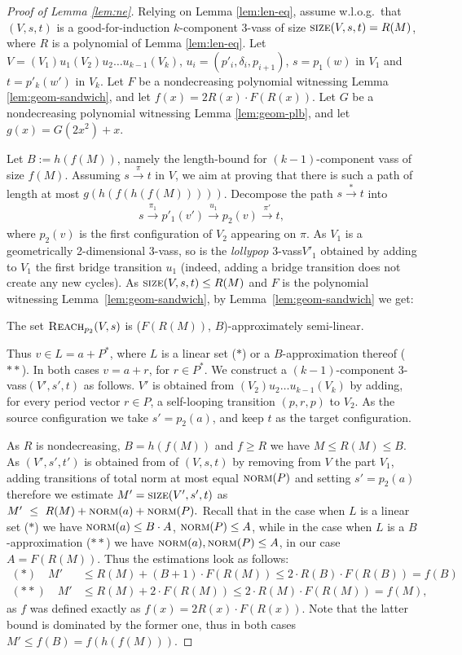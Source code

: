 \documentclass[a4paper, UKenglish, cleveref, autoref, thm-restate]{lipics-v2021}
\newcommand{\reach}{\textsc{Reach}}
\newcommand{\trans}[1]{\stackrel{#1}{\longrightarrow}}
\newcommand{\tran}{\trans{*}}
\newcommand{\norm}{\textsc{norm}}
\newcommand{\size}{\textsc{size}}
\newcommand{\kanapka}[2]{(#1, #2)-approximately semi-linear}
\newcommand{\vass}{{\sc vass}\xspace}
\newcommand{\tvass}{\parvass 3}
\newcommand{\geomvass}{geometrically 2-dimensional \tvass}
\newcommand{\parvass}[1]{{$#1$-\vass}\xspace}
\newcommand{\ktvass}{(V_1) u_1 (V_2) u_2 \ldots u_{k-1} (V_k)}
\newcommand{\ktvasstwo}{(V_2) u_2 \ldots u_{k-1} (V_k)}
\newcommand{\mywlog}{w.l.o.g.~}
\begin{document}
\begin{proof}[Proof of Lemma \ref{lem:ne}]
Relying on Lemma \ref{lem:len-eq}, assume \mywlog that
$(V, s, t)$ is a 
good-for-induction $k$-component \tvass of size
$\size(V, s, t) = R(M)$, where $R$ is a polynomial of Lemma \ref{lem:len-eq}.
Let $V = \ktvass$, $u_i = (p'_i, \delta_i, p_{i+1})$,
$s=p_1(w)$ in $V_1$ and $t=p'_k(w')$ in $V_k$.
Let $F$ be a nondecreasing polynomial witnessing 
Lemma \ref{lem:geom-sandwich}, and
let $f(x) = 2R(x) \cdot F(R(x))$. 
Let $G$ be a nondecreasing polynomial witnessing Lemma  \ref{lem:geom-plb}, and
let $g(x) = G(2x^2) + x$.


Let $B := h(f(M))$, namely the length-bound for $(k-1)$-component \vass of size $f(M)$.
Assuming $s\trans{\pi} t$ in $ V$, we aim at proving that there is such a path of length at most
$g(h(f(h(f(M)))))$.
Decompose the path $s\tran t$ into
\begin{align} \label{eq:pathV}
s \trans{\pi_1} p'_1(v') \trans{u_1} p_2(v) \trans{\pi'} t,
\end{align}
where $p_2(v)$ is the first configuration of $V_2$ appearing on $\pi$.
As $V_1$ is a \geomvass, so is the \emph{lollypop} \tvass $V'_1$ 
obtained by adding to $V_1$ the first bridge transition $u_1$
(indeed, adding a bridge transition does not create any new cycles).
As $\size(V,s,t) \leq R(M)$ and $F$ is the polynomial witnessing Lemma~\ref{lem:geom-sandwich},
by Lemma~\ref{lem:geom-sandwich} we get:
\begin{claim}
The set $\reach_{p_2}(V,s)$ is  \kanapka {$F(R(M))$} {$B$}.
\end{claim}

Thus $v \in L = a + P^*$, where $L$ is a linear set ($*$) or a $B$-approximation thereof ($**$).
In both cases  $v = a + r$, for $r\in P^*$.
We construct a $(k-1)$-component \tvass $(V', s', t)$ as follows.
$V'$ is obtained from $\ktvasstwo$ by adding,
for every period vector $r\in P$, a self-looping transition
$(p, r, p)$ to $ V_2$.
As the source configuration we take $s' = p_2(a)$, and keep $t$ as the target configuration.

As $R$ is nondecreasing, $B = h(f(M))$ and $f \geq R$ we have $M \leq R(M) \leq B$.
As $(V',s',t')$ is obtained from of $(V,s,t)$ by removing from $V$ the part $V_1$,
adding transitions of total norm at most equal $\norm(P)$ and setting $s' = p_2(a)$ 
therefore we estimate  $M' = \size(V', s', t)$ as 
$
M' \ \leq \ R(M) + \norm(a) + \norm(P).
$
Recall that in the case when $L$ is a linear set ($*$) we have $\norm(a) \leq B \cdot A$, $\norm(P) \leq A$,
while in the case when $L$ is a $B$-approximation ($**$) we have $\norm(a), \norm(P) \leq A$,
in our case $A = F(R(M))$.
Thus the estimations
look as follows:
\begin{align*}
(*) \quad M' & \leq R(M) + (B+1) \cdot F(R(M)) \leq  2\cdot R(B) \cdot F(R(B)) = f(B)\\
(**) \quad M' & \leq R(M) + 2 \cdot F(R(M)) \leq 2\cdot R(M) \cdot F(R(M)) = f(M),
\end{align*}
as $f$ was defined exactly as $f(x) = 2R(x) \cdot F(R(x))$.
Note that the latter bound is dominated by the former one, thus in both cases $M' \leq f(B) = f(h(f(M)))$.


\end{proof}
\end{document}
